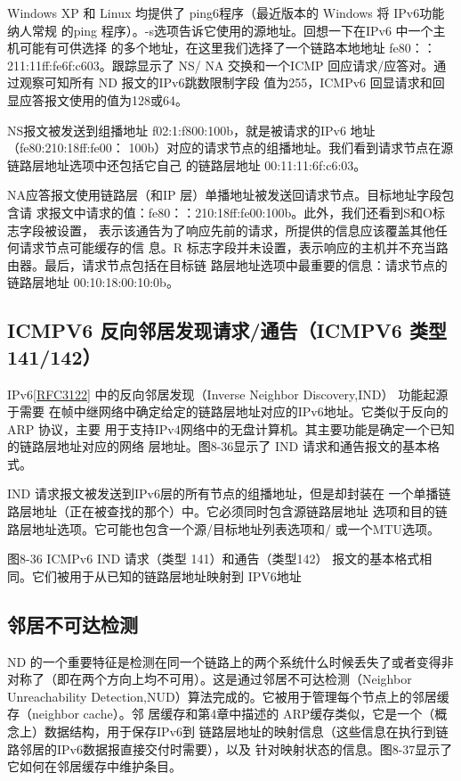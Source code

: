 Windows XP 和 Linux 均提供了 ping6程序（最近版本的 Windows 将 IPv6功能纳人常规
的ping 程序）。-s选项告诉它使用的源地址。回想一下在IPv6 中一个主机可能有可供选择
的多个地址，在这里我们选择了一个链路本地地址 fe80：：211:11ff:fe6f:c603。跟踪显示了 NS/
NA 交换和一个ICMP 回应请求/应答对。通过观察可知所有 ND 报文的IPv6跳数限制字段
值为255，ICMPv6 回显请求和回显应答报文使用的值为128或64。

NS报文被发送到组播地址 f02:1:f800:100b，就是被请求的IPv6 地址 （fe80:210:18ff:fe00：
100b）对应的请求节点的组播地址。我们看到请求节点在源链路层地址选项中还包括它自己
的链路层地址 00:11:11:6f:c6:03。

NA应答报文使用链路层（和IP 层）单播地址被发送回请求节点。目标地址字段包含请
求报文中请求的值：fe80：：210:18ff:fe00:100b。此外，我们还看到S和O标志字段被设置，
表示该通告为了响应先前的请求，所提供的信息应该覆盖其他任何请求节点可能缓存的信
息。R 标志字段并未设置，表示响应的主机并不充当路由器。最后，请求节点包括在目标链
路层地址选项中最重要的信息：请求节点的链路层地址 00:10:18:00:10:0b。

\subsection{ICMPV6 反向邻居发现请求/通告（ICMPV6 类型141/142）}

IPv6\href{https://www.rfc-editor.org/rfc/rfc3122}{[RFC3122]}
中的反向邻居发现（Inverse Neighbor Discovery,IND） 功能起源于需要
在帧中继网络中确定给定的链路层地址对应的IPv6地址。它类似于反向的ARP 协议，主要
用于支持IPv4网络中的无盘计算机。其主要功能是确定一个已知的链路层地址对应的网络
层地址。图8-36显示了 IND 请求和通告报文的基本格式。

IND 请求报文被发送到IPv6层的所有节点的组播地址，但是却封装在
一个单播链路层地址（正在被查找的那个）中。它必须同时包含源链路层地址
选项和目的链路层地址选项。它可能也包含一个源/目标地址列表选项和/
或一个MTU选项。

图8-36 ICMPv6 IND 请求（类型 141）和通告（类型142）
报文的基本格式相同。它们被用于从已知的链路层地址映射到 IPV6地址

\subsection{邻居不可达检测}

ND 的一个重要特征是检测在同一个链路上的两个系统什么时候丢失了或者变得非
对称了（即在两个方向上均不可用）。这是通过邻居不可达检测（Neighbor Unreachability
Detection,NUD）算法完成的。它被用于管理每个节点上的邻居缓存（neighbor cache）。邻
居缓存和第4章中描述的 ARP缓存类似，它是一个（概念上）数据结构，用于保存IPv6到
链路层地址的映射信息（这些信息在执行到链路邻居的IPv6数据报直接交付时需要），以及
针对映射状态的信息。图8-37显示了它如何在邻居缓存中维护条目。


